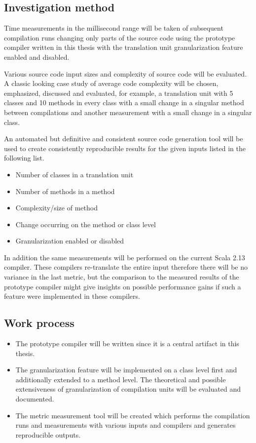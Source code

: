 \documentclass{VUMIFPSbakalaurinis}
\begin{document}
\begin{samepage}
\subsection{Investigation method}
Time measurements in the millisecond range will be taken of subsequent compilation runs changing only parts of the source code using the prototype compiler written in this thesis with the translation unit granularization feature enabled and disabled.

Various source code input sizes and complexity of source code will be evaluated.
A classic looking case study of average code complexity will be chosen, emphasized, discussed and evaluated, for example, a translation unit with 5 classes and 10 methods in every class with a small change in a singular method between compilations and another measurement with a small change in a singular class.

An automated but definitive and consistent source code generation tool will be used to create consistently reproducible results for the given inputs listed in the following list.

\begin{itemize}
	\item Number of classes in a translation unit
	\item Number of methods in a method
	\item Complexity/size of method
	\item Change occurring on the method or class level
	\item Granularization enabled or disabled
\end{itemize}

In addition the same measurements will be performed on the current Scala 2.13 \cite{Scala2013} compiler.
These compilers re-translate the entire input therefore there will be no variance in the last metric, but the comparison to the measured results of the prototype compiler might give insights on possible performance gains if such a feature were implemented in these compilers.

\pagebreak
\subsection{Work process}
\begin{itemize}
	\item{The prototype compiler will be written since it is a central artifact in this thesis.}
	\item{The granularization feature will be implemented on a class level first and additionally extended to a method level.
The theoretical and possible extensiveness of granularization of compilation units will be evaluated and documented.}

	\item{The metric measurement tool will be created which performs the compilation runs and measurements with various inputs and compilers and generates reproducible outputs.}

\end{itemize}

\end{samepage}
\end{document}
